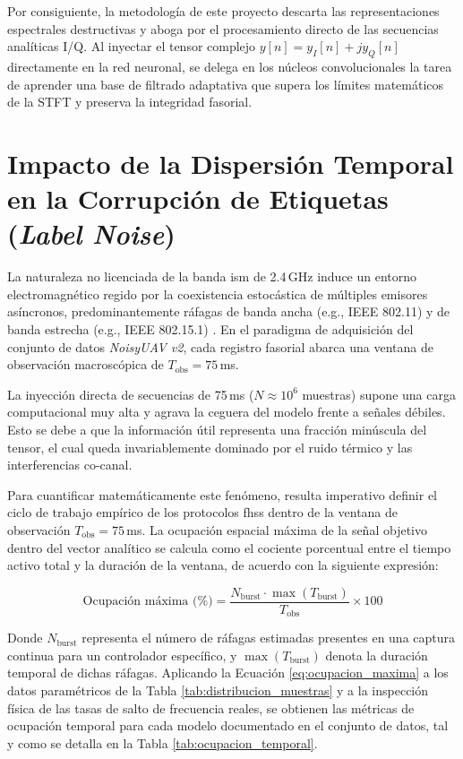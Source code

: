 Por consiguiente, la metodología de este proyecto descarta las representaciones espectrales destructivas y aboga por el procesamiento directo de las secuencias analíticas I/Q. Al inyectar el tensor complejo $y[n] = y_I[n] + j y_Q[n]$ directamente en la red neuronal, se delega en los núcleos convolucionales la tarea de aprender una base de filtrado adaptativa que supera los límites matemáticos de la STFT y preserva la integridad fasorial.

\section{Impacto de la Dispersión Temporal en la Corrupción de Etiquetas (\textit{Label Noise})}
\label{sec:label_noise}

La naturaleza no licenciada de la banda \gls{ism} de 2.4\,GHz induce un entorno electromagnético regido por la coexistencia estocástica de múltiples emisores asíncronos, predominantemente ráfagas de banda ancha (e.g., IEEE 802.11) y de banda estrecha (e.g., IEEE 802.15.1) \cite{ezuma_detection_2020}. En el paradigma de adquisición del conjunto de datos \textit{NoisyUAV v2}, cada registro fasorial abarca una ventana de observación macroscópica de $T_{\text{obs}} = 75$\,ms. 

La inyección directa de secuencias de 75\,ms ($N \approx 10^6$ muestras) supone una carga computacional muy alta y agrava la ceguera del modelo frente a señales débiles. Esto se debe a que la información útil representa una fracción minúscula del tensor, el cual queda invariablemente dominado por el ruido térmico y las interferencias co-canal.

Para cuantificar matemáticamente este fenómeno, resulta imperativo definir el ciclo de trabajo empírico de los protocolos \gls{fhss} dentro de la ventana de observación $T_{\text{obs}} = 75$\,ms. La ocupación espacial máxima de la señal objetivo dentro del vector analítico se calcula como el cociente porcentual entre el tiempo activo total y la duración de la ventana, de acuerdo con la siguiente expresión:

\begin{equation}
    \text{Ocupación máxima (\%)} = \frac{N_{\text{burst}} \cdot \max(T_{\text{burst}})}{T_{\text{obs}}} \times 100
    \label{eq:ocupacion_maxima}
\end{equation}

Donde $N_{\text{burst}}$ representa el número de ráfagas estimadas presentes en una captura continua para un controlador específico, y $\max(T_{\text{burst}})$ denota la duración temporal de dichas ráfagas. Aplicando la Ecuación \ref{eq:ocupacion_maxima} a los datos paramétricos de la Tabla \ref{tab:distribucion_muestras} y a la inspección física de las tasas de salto de frecuencia reales, se obtienen las métricas de ocupación temporal para cada modelo documentado en el conjunto de datos, tal y como se detalla en la Tabla \ref{tab:ocupacion_temporal}.

